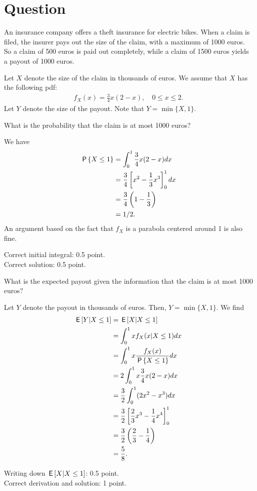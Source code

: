 \section*{Question}


An insurance company offers a theft insurance for electric bikes. When a claim is filed, the insurer pays out the size of the claim, with a maximum of 1000 euros. So a claim of 500 euros is paid out completely, while a claim of 1500 euros yields a payout of 1000 euros.

Let $X$ denote the size of the claim in thousands of euros. We assume that $X$ has the following pdf:
\begin{align}
    f_X(x) = \frac{3}{4}x(2-x), \quad 0 \leq x \leq 2.
\end{align}
Let $Y$ denote the size of the payout. Note that $Y = \min\{X,1\}$.

\begin{exercise}[1]
What is the probability that the claim is at most 1000 euros?
\begin{solution}
We have
\begin{align}
    \P{X \leq 1} &= \int_0^1 \frac{3}{4} x (2-x) dx \\
    &=  \frac{3}{4}\left[ x^2 - \frac{1}{3} x^3 \right]_0^1 dx \\
    &=  \frac{3}{4}\left( 1 - \frac{1}{3} \right) \\
    &= 1/2.
\end{align}
An argument based on the fact that $f_X$ is a parabola centered around 1 is also fine.

Correct initial integral: 0.5 point.\\
Correct solution: 0.5 point.
\end{solution}
\end{exercise}

\begin{exercise}[1.5]
What is the expected payout given the information that the claim is at most 1000 euros?
\begin{solution}
Let $Y$ denote the payout in thousands of euros. Then, $Y = \min\{X,1\}$. We find
\begin{align}
    \E{Y|X\leq 1} &= \E{X|X\leq 1} \\
    &= \int_0^1 x f_X(x|X\leq 1) dx \\
    &= \int_0^1 x \frac{f_X(x)}{\P{X \leq 1}} dx \\
    &= 2 \int_0^1 x \frac{3}{4} x (2-x)  dx \\
    &= \frac{3}{2} \int_0^1 (2x^2 - x^3)  dx \\
    &= \frac{3}{2} \left[ \frac{2}{3} x^3 - \frac{1}{4} x^4\right]_0^1 \\
    &= \frac{3}{2} \left( \frac{2}{3} - \frac{1}{4} \right) \\
    &= \frac{5}{8}.
\end{align}

Writing down $\E{X|X\leq 1}$: 0.5 point.\\
Correct derivation and solution: 1 point.
\end{solution}
\end{exercise}

